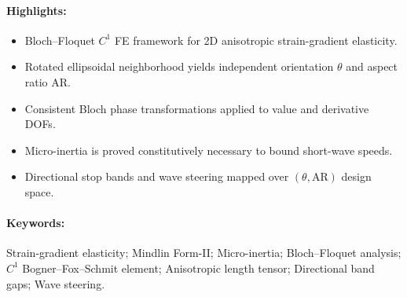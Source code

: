 \documentclass[11pt,a4paper]{article}
\begin{document}
\paragraph{Highlights:}
\begin{itemize}[leftmargin=1.5em,itemsep=1pt]
  \item Bloch--Floquet $C^1$ FE framework for 2D anisotropic strain-gradient elasticity.
  \item Rotated ellipsoidal neighborhood yields independent orientation $\theta$ and aspect ratio $\mathrm{AR}$.
  \item Consistent Bloch phase transformations applied to value and derivative DOFs.
  \item Micro-inertia is proved constitutively necessary to bound short-wave speeds.
  \item Directional stop bands and wave steering mapped over $(\theta, \mathrm{AR})$ design space.
\end{itemize}

\paragraph{Keywords:}
Strain-gradient elasticity; Mindlin Form-II; Micro-inertia; Bloch--Floquet analysis; $C^1$ Bogner--Fox--Schmit element; Anisotropic length tensor; Directional band gaps; Wave steering.

\newpage











\appendix



\newpage


\end{document}
